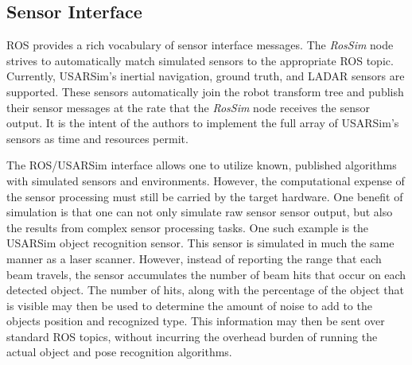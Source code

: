 \subsection*{Sensor Interface} 
ROS provides a rich vocabulary of sensor interface messages. The {\it RosSim} node strives to automatically match simulated sensors to the appropriate ROS topic. Currently, USARSim's inertial navigation, ground truth, and LADAR sensors are supported. These sensors automatically join the robot transform tree and publish their sensor messages at the rate that the {\it RosSim} node receives the sensor output. It is the intent of the authors to implement the full array of USARSim's sensors as time and resources permit.

The ROS/USARSim interface allows one to utilize known, published algorithms with simulated sensors and environments. However, the computational expense of the sensor processing must still be carried by the target hardware. One benefit of simulation is that one can not only simulate raw sensor sensor output, but also the results from complex sensor processing tasks. One such example is the USARSim object recognition sensor. This sensor  is simulated in much the same manner as a laser scanner. However, instead of reporting the range that each beam travels, the sensor accumulates the number of beam hits that occur on each detected object. The number of hits, along with the percentage of the object that is visible may then be used to determine the amount of noise to add to the objects position and recognized type. This information may then be sent over standard ROS topics, without incurring the overhead burden of running the actual object and pose recognition algorithms.
